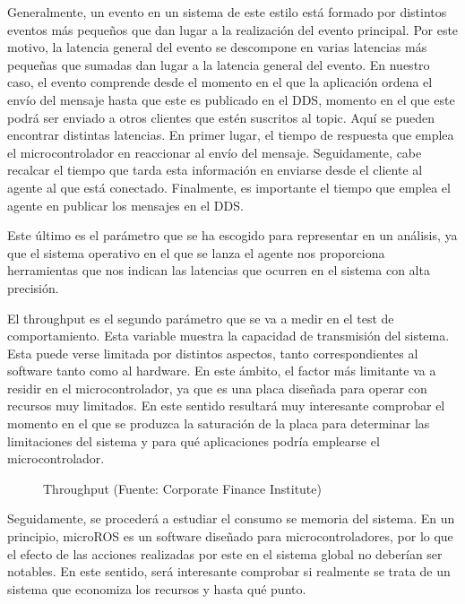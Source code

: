 \documentclass[a4paper,11pt,spanish]{sphinxmanual}
\let\sphinxpxdimen\pdfpxdimen\else\newdimen\sphinxpxdimen
\begin{document}
\sphinxAtStartPar
Generalmente, un evento en un sistema de este estilo está formado por distintos
eventos más pequeños que dan lugar a la realización del evento principal. Por
este motivo, la latencia general del evento se descompone en varias latencias
más pequeñas que sumadas dan lugar a la latencia general del evento. En nuestro
caso, el evento comprende desde el momento en el que la aplicación ordena el envío
del mensaje hasta que este es publicado en el DDS, momento en el que este podrá
ser enviado a otros clientes que estén suscritos al topic.
Aquí se pueden encontrar distintas latencias. En primer lugar, el tiempo de respuesta
que emplea el microcontrolador en reaccionar al envío del mensaje. Seguidamente,
cabe recalcar el tiempo que tarda esta información en enviarse desde el cliente
al agente al que está conectado. Finalmente, es importante el tiempo que emplea
el agente en publicar los mensajes en el DDS.

\sphinxAtStartPar
Este último es el parámetro que se ha escogido para representar en un análisis, ya
que el sistema operativo en el que se lanza el agente nos proporciona herramientas
que nos indican las latencias que ocurren en el sistema con alta precisión.

\sphinxAtStartPar
El throughput es el segundo parámetro que se va a medir en el test de comportamiento.
Esta variable muestra la capacidad de transmisión del sistema. Esta puede verse
limitada por distintos aspectos, tanto correspondientes al software tanto como
al hardware. En este ámbito, el factor más limitante va a residir en el microcontrolador,
ya que es una placa diseñada para operar con recursos muy limitados. En este
sentido resultará muy interesante comprobar el momento en el que se produzca la
saturación de la placa para determinar las limitaciones del sistema y para qué aplicaciones
podría emplearse el microcontrolador.

\begin{figure}[htbp]
\centering
\capstart

\noindent\sphinxincludegraphics[width=200\sphinxpxdimen]{{throughput}.jpeg}
\caption{Throughput (Fuente: Corporate Finance Institute)}\label{\detokenize{dise_xf1o_del_analisis:id9}}\end{figure}

\sphinxAtStartPar
Seguidamente, se procederá a estudiar el consumo se memoria del sistema. En un principio,
micro\sphinxhyphen{}ROS es un software diseñado para microcontroladores, por lo que el efecto
de las acciones realizadas por este en el sistema global no deberían ser notables.
En este sentido, será interesante comprobar si realmente se trata de un sistema que
economiza los recursos y hasta qué punto.
\end{document}
